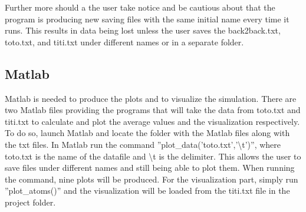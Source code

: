 Further more should a the user take notice and be cautious about that the program is producing new saving files with the same initial name every time it runs. This results in data being lost unless the user saves the back2back.txt, toto.txt, and titi.txt under different names or in a separate folder.

\subsection{Matlab}
Matlab is needed to produce the plots and to visualize the simulation. There are two Matlab files providing the programs that will take the data from toto.txt and titi.txt to calculate and plot the average values and the visualization respectively. To do so, launch Matlab and locate the folder with the Matlab files along with the txt files. In Matlab run the command ''plot\_data('toto.txt','\textbackslash{}t')'', where toto.txt is the name of the datafile and \textbackslash{}t is the delimiter. This allows the user to save files under different names and still being able to plot them. When running the command, nine plots will be produced. For the visualization part, simply run ''plot\_atoms()'' and the visualization will be loaded from the titi.txt file in the project folder.